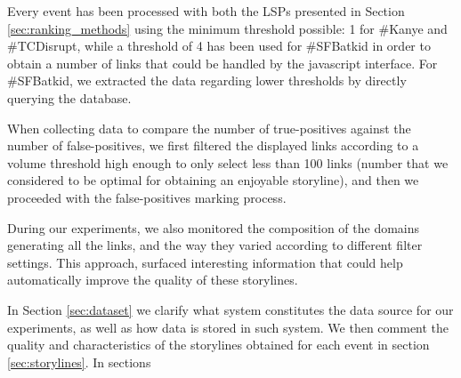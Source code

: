 \documentclass{sig-alternate}
\begin{document}
Every event has been processed with both the LSPs presented in Section \ref{sec:ranking_methods} using the minimum threshold possible: 1 for \#Kanye and \#TCDisrupt, while a threshold of 4 has been used for \#SFBatkid in order to obtain a number of links that could be handled by the javascript interface. For \#SFBatkid, we extracted the data regarding lower thresholds by directly querying the database.

When collecting data to compare the number of true-positives against the number of false-positives, we first filtered the displayed links according to a volume threshold high enough to only select less than 100 links (number that we considered to be optimal for obtaining an enjoyable storyline), and then we proceeded with the false-positives marking process.

During our experiments, we also monitored the composition of the domains generating all the links, and the way they varied according to different filter settings. This approach, surfaced interesting information that could help automatically improve the quality of these storylines.

In Section \ref{sec:dataset} we clarify what system constitutes the data source for our experiments, as well as how data is stored in such system. We then comment the quality and characteristics of the storylines obtained for each event in section \ref{sec:storylines}. In sections 
\end{document}
